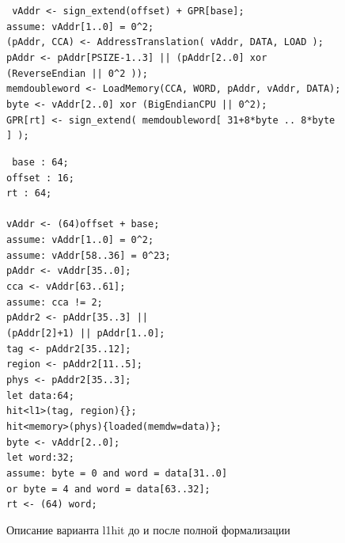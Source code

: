 \begin{figure}[h]
\noindent\parbox{0.4\textwidth}{ \footnotesize \tt
vAddr <- sign\_extend(offset) + GPR[base];\\
assume: vAddr[1..0] = 0\^{}2;\\
(pAddr, CCA) <- AddressTranslation( vAddr, DATA, LOAD );\\
pAddr <- pAddr[PSIZE-1..3] || (pAddr[2..0] xor (ReverseEndian || 0\^{}2 ));\\
memdoubleword <- LoadMemory(CCA, WORD, pAddr, vAddr, DATA);\\
byte <- vAddr[2..0] xor (BigEndianCPU || 0\^{}2);\\
GPR[rt] <- sign\_extend( memdoubleword[ 31+8*byte .. 8*byte ] );\\
} \parbox{0.1\textwidth}{ \quad
} \parbox{0.5\textwidth}{ \footnotesize \tt
base : 64;\\
offset : 16;\\
rt : 64;\\
\\
vAddr <- (64)offset + base;\\
assume: vAddr[1..0] = 0\^{}2;\\
assume: vAddr[58..36] = 0\^{}23;\\
pAddr <- vAddr[35..0];\\
cca <- vAddr[63..61];\\
assume: cca != 2;\\
pAddr2 <- pAddr[35..3] ||\\
\indent\hspace{1cm}(pAddr[2]+1) || pAddr[1..0];\\
tag <- pAddr2[35..12];\\
region <- pAddr2[11..5];\\
phys <- pAddr2[35..3];\\
let data:64;\\
hit<l1>(tag, region)\{\};\\
hit<memory>(phys)\{loaded(memdw=data)\};\\
byte <- vAddr[2..0];\\
let word:32;\\
assume: byte = 0 and word = data[31..0]\\
\indent\hspace{1cm}or byte = 4 and word = data[63..32];\\
rt <- (64) word;}
\caption{Описание варианта l1hit до и после полной формализации}\label{fig:l1hit_model}
\end{figure}

